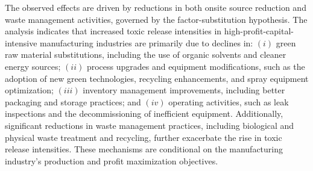 \documentclass[authoryear, preprint, twocolumn, 1p]{elsarticle}
\begin{document}
    The observed effects are driven by reductions in both onsite source reduction and waste management activities, governed by the factor-substitution hypothesis. The analysis indicates that increased toxic release intensities in high-profit-capital-intensive manufacturing industries are primarily due to declines in: $(i)$ green raw material substitutions, including the use of organic solvents and cleaner energy sources; $(ii)$ process upgrades and equipment modifications, such as the adoption of new green technologies, recycling enhancements, and spray equipment optimization; $(iii)$ inventory management improvements, including better packaging and storage practices; and $(iv)$ operating activities, such as leak inspections and the decommissioning of inefficient equipment. Additionally, significant reductions in waste management practices, including biological and physical waste treatment and recycling, further exacerbate the rise in toxic release intensities. These mechanisms are conditional on the manufacturing industry's production and profit maximization objectives.
\end{document}
